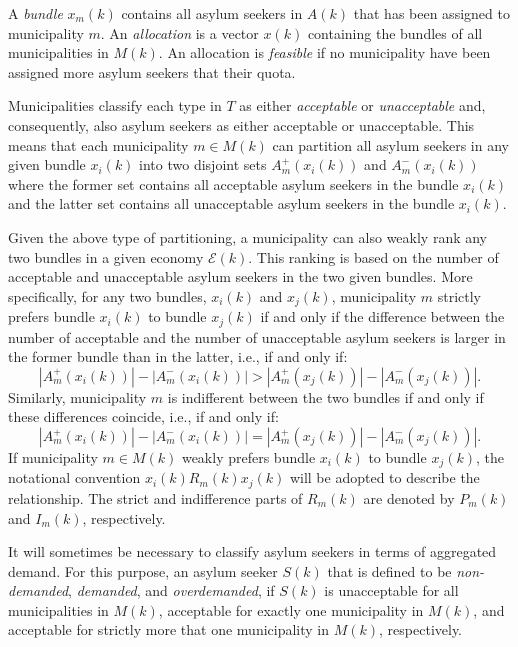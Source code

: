 \documentclass[12pt,fleqn]{article}
\begin{document}
A \emph{bundle} $x_m(k)$ contains all asylum seekers in $A(k)$ that has been assigned to municipality $m$. An \emph{allocation} is a vector $x(k)$ containing the bundles of all municipalities in $M(k)$. An allocation is \emph{feasible} if no municipality have been assigned more asylum seekers that their quota.

Municipalities classify each type in $T$ as either \emph{acceptable} or \emph{unacceptable} and, consequently, also asylum seekers as either acceptable or unacceptable. This means that each municipality $m\in M(k)$ can partition all asylum seekers in any given bundle $x_i(k)$ into two disjoint sets $A^+_m(x_i(k))$ and $A^-_m(x_i(k))$ where the former set contains all acceptable asylum seekers in the bundle $x_i(k)$ and the latter set contains all unacceptable asylum seekers in the bundle $x_i(k)$.

Given the above type of partitioning, a municipality can also weakly rank any two bundles in a given economy $\mathcal{E}(k)$. This ranking is based on the number of acceptable and unacceptable asylum seekers in the two given bundles. More specifically, for any two bundles, $x_i(k)$ and $x_j(k)$, municipality $m$ strictly prefers bundle $x_i(k)$ to bundle $x_j(k)$ if and only if the difference between the number of acceptable and the number of unacceptable asylum seekers is larger in the former bundle than in the latter, i.e., if and only if:
\begin{equation*}
|A_m^+(x_i(k))|-|A_m^-(x_i(k))|>|A_m^+(x_j(k))|-|A_m^-(x_j(k))|.
\end{equation*}
\noindent Similarly, municipality $m$ is indifferent between the two bundles if and only if these differences coincide, i.e., if and only if:
\begin{equation*}
|A_m^+(x_i(k))|-|A_m^-(x_i(k))|=|A_m^+(x_j(k))|-|A_m^-(x_j(k))|.
\end{equation*}
\noindent If municipality $m\in M(k)$ weakly prefers bundle $x_i(k)$ to bundle $x_j(k)$, the notational convention $x_i(k)R_m(k) x_j(k)$ will be adopted to describe the relationship. The strict and indifference parts of $R_m(k)$ are denoted by $P_m(k)$ and $I_m(k)$, respectively.

It will sometimes be necessary to classify asylum seekers in terms of aggregated demand. For this purpose, an asylum seeker $S(k)$ that is defined to be \emph{non-demanded}, \emph{demanded}, and \emph{overdemanded}, if $S(k)$ is unacceptable for all municipalities in $M(k)$, acceptable for exactly one municipality in $M(k)$, and acceptable for strictly more that one municipality in $M(k)$, respectively.
\end{document}
